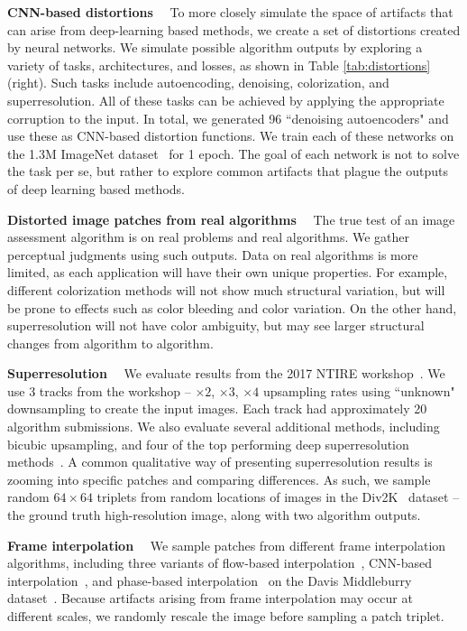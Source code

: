   \textbf{CNN-based distortions} \ \  To more closely simulate the space of artifacts that can arise from deep-learning based methods, we create a set of distortions created by neural networks. We simulate possible algorithm outputs by exploring a variety of tasks, architectures, and losses, as shown in Table \ref{tab:distortions} (right). Such tasks include autoencoding, denoising, colorization, and superresolution. All of these tasks can be achieved by applying the appropriate corruption to the input. In total, we generated 96 ``denoising autoencoders" and use these as CNN-based distortion functions. We train each of these  networks on the 1.3M ImageNet dataset~\cite{russakovsky2015imagenet} for 1 epoch. The goal of each network is not to solve the task per se, but rather to explore common artifacts that plague the outputs of deep learning based methods.

  \textbf{Distorted image patches from real algorithms} \ \ 
The true test of an image assessment algorithm is on real problems and real algorithms. We gather perceptual judgments using such outputs. Data on real algorithms is more limited, as each application will have their own unique properties. For example, different colorization methods will not show much structural variation, but will be prone to effects such as color bleeding and color variation. On the other hand, superresolution will not have color ambiguity, but may see larger structural changes from algorithm to algorithm.

  \textbf{Superresolution} \ \  We evaluate results from the 2017 NTIRE workshop~\cite{Agustsson_2017_CVPR_Workshops}. We use 3 tracks from the workshop -- $\times2$, $\times3$, $\times4$ upsampling rates using ``unknown" downsampling to create the input images. Each track had approximately 20 algorithm submissions. We also evaluate several additional methods, including bicubic upsampling, and four of the top performing deep superresolution methods~\cite{kim2016accurate,wang2015deep,ledig2016photo,sajjadi2016enhancenet}. A common qualitative way of presenting superresolution results is zooming into specific patches and comparing differences. As such, we sample random $64\times 64$ triplets from random locations of images in the Div2K~\cite{Agustsson_2017_CVPR_Workshops} dataset -- the ground truth high-resolution image, along with two algorithm outputs.

  \textbf{Frame interpolation} \ \  We sample patches from different frame interpolation algorithms, including three variants of flow-based interpolation~\cite{liu2009beyond}, CNN-based interpolation~\cite{Niklaus_ICCV_2017}, and phase-based interpolation~\cite{meyer2015phase} on the Davis Middleburry dataset~\cite{scharstein2002taxonomy}. Because artifacts arising from frame interpolation may occur at different scales, we randomly rescale the image before sampling a patch triplet.

